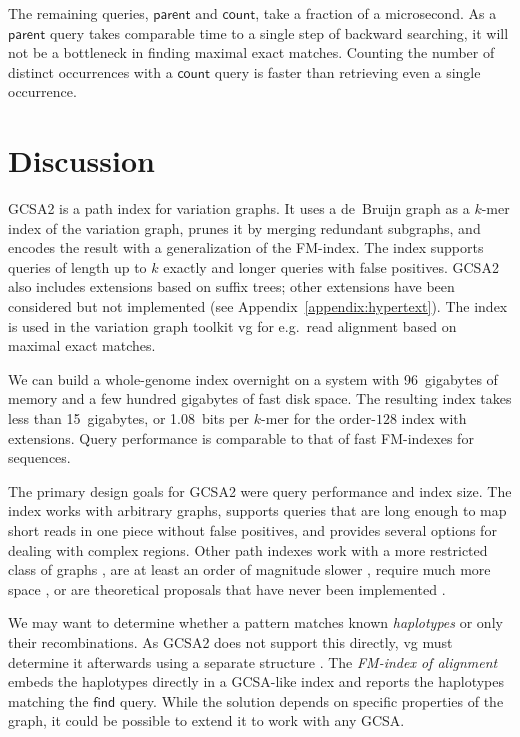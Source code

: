 \documentclass[twoside,leqno,twocolumn]{article}
\newcommand{\find}{\ensuremath{\mathsf{find}}}
\newcommand{\parent}{\ensuremath{\mathsf{parent}}}
\newcommand{\countq}{\ensuremath{\mathsf{count}}}
\newcommand{\kmer}[1]{$#1$\nobreakdash-mer}
\newcommand{\orderk}[1]{order\nobreakdash-$#1$}
\begin{document}
The remaining queries, $\parent$ and $\countq$, take a fraction of a microsecond. As a $\parent$ query takes comparable time to a single step of backward searching, it will not be a bottleneck in finding maximal exact matches. Counting the number of distinct occurrences with a $\countq$ query is faster than retrieving even a single occurrence.


\section{Discussion}

GCSA2 is a path index for variation graphs. It uses a de~Bruijn graph as a \kmer{k} index of the variation graph, prunes it by merging redundant subgraphs, and encodes the result with a generalization of the FM\nobreakdash-index. The index supports queries of length up to $k$ exactly and longer queries with false positives. GCSA2 also includes extensions based on suffix trees; other extensions have been considered but not implemented (see Appendix~\ref{appendix:hypertext}). The index is used in the variation graph toolkit vg for e.g.~read alignment based on maximal exact matches.

We can build a whole-genome index overnight on a system with 96~gigabytes of memory and a few hundred gigabytes of fast disk space. The resulting index takes less than 15~gigabytes, or 1.08~bits per \kmer{k} for the \orderk{128} index with extensions. Query performance is comparable to that of fast FM-indexes for sequences.

The primary design goals for GCSA2 were query performance and index size. The index works with arbitrary graphs, supports queries that are long enough to map short reads in one piece without false positives, and provides several options for dealing with complex regions. Other path indexes work with a more restricted class of graphs \cite{Siren2014,Huang2013,Kim2015-2016,Maciuca2016}, are at least an order of magnitude slower \cite{Huang2013,Maciuca2016}, require much more space \cite{Bowe2012,Pell2012,Cazaux2014,Marcus2014}, or are theoretical proposals that have never been implemented \cite{Thachuk2013}.

We may want to determine whether a pattern matches known \emph{haplotypes} or only their recombinations. As GCSA2 does not support this directly, vg must determine it afterwards using a separate structure \cite{Novak2016}. The \emph{FM\nobreakdash-index of alignment} \cite{Na2015,Na2016} embeds the haplotypes directly in a GCSA-like index and reports the haplotypes matching the $\find$ query. While the solution depends on specific properties of the graph, it could be possible to extend it to work with any GCSA.
\end{document}

